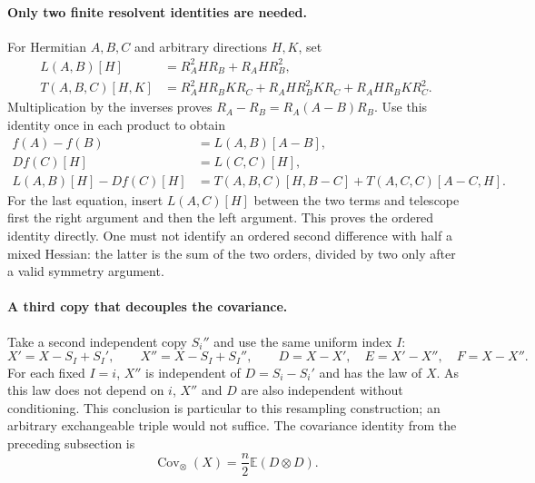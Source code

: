 \documentclass[11pt,a4paper]{article}
\begin{document}
\paragraph{Only two finite resolvent identities are needed.}
For Hermitian $A,B,C$ and arbitrary directions $H,K$, set
\begin{align*}
 L(A,B)[H]&=R_A^2HR_B+R_AHR_B^2,\\
 T(A,B,C)[H,K]&=R_A^2HR_BKR_C+R_AHR_B^2KR_C+R_AHR_BKR_C^2.
\end{align*}
Multiplication by the inverses proves $R_A-R_B=R_A(A-B)R_B$.
Use this identity once in each product to obtain
\begin{align}
 f(A)-f(B)&=L(A,B)[A-B],\label{eq:comparison-L}\\
 Df(C)[H]&=L(C,C)[H],\nonumber\\
 L(A,B)[H]-Df(C)[H]
   &=T(A,B,C)[H,B-C]+T(A,C,C)[A-C,H].\label{eq:comparison-T}
\end{align}
For the last equation, insert $L(A,C)[H]$ between the two terms and
telescope first the right argument and then the left argument.
This proves the ordered identity directly.  One must not identify an
ordered second difference with half a mixed Hessian: the latter is the
sum of the two orders, divided by two only after a valid symmetry argument.

\paragraph{A third copy that decouples the covariance.}
Take a second independent copy $S_i''$ and use the same uniform index $I$:
\[
 X'=X-S_I+S_I',\qquad X''=X-S_I+S_I'',\qquad
 D=X-X',\quad E=X'-X'',\quad F=X-X''.
\]
For each fixed $I=i$, $X''$ is independent of $D=S_i-S_i'$ and has
the law of $X$.  As this law does not depend on $i$, $X''$ and $D$ are
also independent without conditioning.  This conclusion is particular
to this resampling construction; an arbitrary exchangeable triple would
not suffice.  The covariance identity from the preceding subsection is
\[
 \operatorname{Cov}_{\otimes}(X)=\frac n2\mathbb E(D\otimes D).
\]
\end{document}
